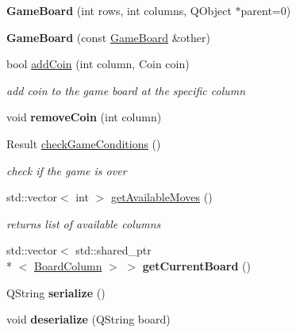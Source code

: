 \begin{DoxyCompactItemize}
\item 
\hypertarget{class_game_board_ae9975214e1b9b33c8d796937aa42520e}{{\bfseries Game\-Board} (int rows, int columns, Q\-Object $\ast$parent=0)}\label{class_game_board_ae9975214e1b9b33c8d796937aa42520e}

\item 
\hypertarget{class_game_board_ac3f19f16873e19e03d56b06ced39792c}{{\bfseries Game\-Board} (const \hyperlink{class_game_board}{Game\-Board} \&other)}\label{class_game_board_ac3f19f16873e19e03d56b06ced39792c}

\item 
bool \hyperlink{class_game_board_a706ae720beb9de8147298676dc75283c}{add\-Coin} (int column, Coin coin)
\begin{DoxyCompactList}\small\item\em add coin to the game board at the specific column \end{DoxyCompactList}\item 
\hypertarget{class_game_board_a99daa5b67393b74abddfd293b17a2acb}{void {\bfseries remove\-Coin} (int column)}\label{class_game_board_a99daa5b67393b74abddfd293b17a2acb}

\item 
\hypertarget{class_game_board_a72290b30d47b27d1a929150cd9d16305}{Result \hyperlink{class_game_board_a72290b30d47b27d1a929150cd9d16305}{check\-Game\-Conditions} ()}\label{class_game_board_a72290b30d47b27d1a929150cd9d16305}

\begin{DoxyCompactList}\small\item\em check if the game is over \end{DoxyCompactList}\item 
\hypertarget{class_game_board_ad2c44e434b52ccb41d4b272b498cbbac}{std\-::vector$<$ int $>$ \hyperlink{class_game_board_ad2c44e434b52ccb41d4b272b498cbbac}{get\-Available\-Moves} ()}\label{class_game_board_ad2c44e434b52ccb41d4b272b498cbbac}

\begin{DoxyCompactList}\small\item\em returns list of available columns \end{DoxyCompactList}\item 
\hypertarget{class_game_board_ae90c2043ae979dc35dea08113bac278a}{std\-::vector$<$ std\-::shared\-\_\-ptr\\*
$<$ \hyperlink{class_board_column}{Board\-Column} $>$ $>$ {\bfseries get\-Current\-Board} ()}\label{class_game_board_ae90c2043ae979dc35dea08113bac278a}

\item 
\hypertarget{class_game_board_ad533f495fa4f39c15e1164a1a5bb702e}{Q\-String {\bfseries serialize} ()}\label{class_game_board_ad533f495fa4f39c15e1164a1a5bb702e}

\item 
\hypertarget{class_game_board_abfd027ca1bf36698290855faff44d1a3}{void {\bfseries deserialize} (Q\-String board)}\label{class_game_board_abfd027ca1bf36698290855faff44d1a3}

\end{DoxyCompactItemize}
